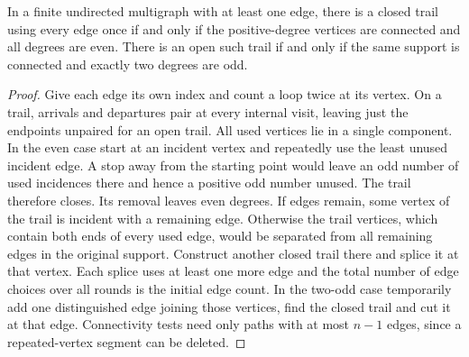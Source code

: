 \begin{proposition}\label{result26}
In a finite undirected multigraph with at least one edge, there is a closed trail using every edge once if and only if the positive-degree vertices are connected and all degrees are even. There is an open such trail if and only if the same support is connected and exactly two degrees are odd.
\end{proposition}
\begin{proof}
Give each edge its own index and count a loop twice at its vertex. On a trail, arrivals and departures pair at every internal visit, leaving just the endpoints unpaired for an open trail. All used vertices lie in a single component. In the even case start at an incident vertex and repeatedly use the least unused incident edge. A stop away from the starting point would leave an odd number of used incidences there and hence a positive odd number unused. The trail therefore closes. Its removal leaves even degrees. If edges remain, some vertex of the trail is incident with a remaining edge. Otherwise the trail vertices, which contain both ends of every used edge, would be separated from all remaining edges in the original support. Construct another closed trail there and splice it at that vertex. Each splice uses at least one more edge and the total number of edge choices over all rounds is the initial edge count. In the two-odd case temporarily add one distinguished edge joining those vertices, find the closed trail and cut it at that edge. Connectivity tests need only paths with at most $n-1$ edges, since a repeated-vertex segment can be deleted.
\end{proof}

